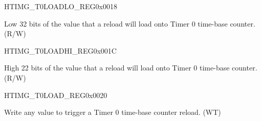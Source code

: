 \begin{register}{H}{TIMG\_T0LOADLO\_REG}{0x0018}\label{regdesc:TIMGTXLOADLOREG}
%
\regnewline%
\begin{regdesc}\begin{reglist}
\label{fielddesc:TIMGTXLOADLO}\item [TIMG\_T0\_LOAD\_LO] Low 32 bits of the value that a reload will load onto Timer 0 time-base
counter. (R/W)
\end{reglist}\end{regdesc}
\end{register}


\begin{register}{H}{TIMG\_T0LOADHI\_REG}{0x001C}\label{regdesc:TIMGTXLOADHIREG}
%
%
\regnewline%
\begin{regdesc}\begin{reglist}
\label{fielddesc:TIMGTXLOADHI}\item [TIMG\_T0\_LOAD\_HI] High 22 bits of the value that a reload will load onto Timer 0 time-base
counter. (R/W)
\end{reglist}\end{regdesc}
\end{register}


\begin{register}{H}{TIMG\_T0LOAD\_REG}{0x0020}\label{regdesc:TIMGTXLOADREG}
%
\regnewline%
\begin{regdesc}\begin{reglist}
\label{fielddesc:TIMGTXLOAD}\item [TIMG\_T0\_LOAD] 
Write any value to trigger a Timer 0 time-base counter reload. (WT)
\end{reglist}\end{regdesc}
\end{register}


